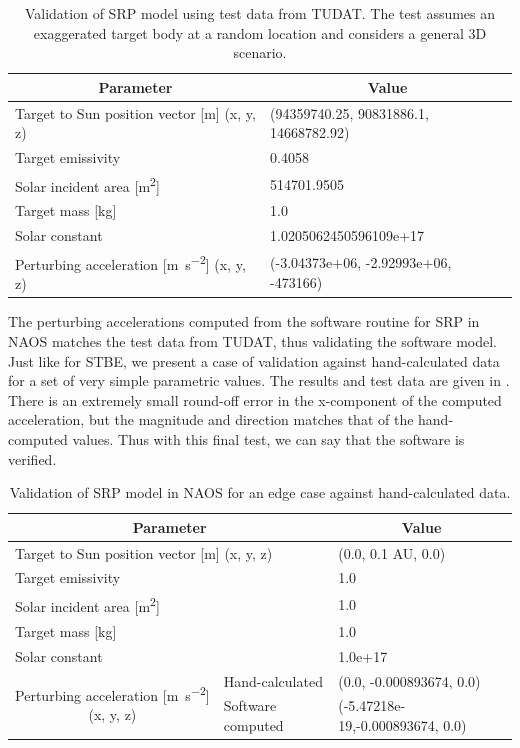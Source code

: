 \begin{table}[htb]
\centering
\captionsetup{justification=centering}
\caption{Validation of \gls{SRP} model using test data from \gls{TUDAT}. The test assumes an exaggerated target body at a random location and considers a general 3D scenario.}
\label{tab:srp_vv_tudat_data_2}
\begin{tabular}{|l|l|}
\hline
\multicolumn{1}{|c|}{\textbf{Parameter}} & \multicolumn{1}{c|}{\textbf{Value}} \\ \hline
Target to Sun position vector {[}m{]} (x, y, z) & (94359740.25, 90831886.1, 14668782.92) \\ \hline
Target emissivity & 0.4058 \\ \hline
Solar incident area {[}\si{\metre \squared}{]} & 514701.9505 \\ \hline
Target mass {[}kg{]} & 1.0 \\ \hline
Solar constant & 1.0205062450596109e+17 \\ \hline
Perturbing acceleration {[}\si{\metre \per \second \squared}{]} (x, y, z) & (-3.04373e+06, -2.92993e+06, -473166) \\ \hline
\end{tabular}
\end{table}
\FloatBarrier
The perturbing accelerations computed from the software routine for \gls{SRP} in \gls{NAOS} matches the test data from \gls{TUDAT}, thus validating the software model. Just like for \gls{STBE}, we present a case of validation against hand-calculated data for a set of very simple parametric values. The results and test data are given in . There is an extremely small round-off error in the x-component of the computed acceleration, but the magnitude and direction matches that of the hand-computed values. Thus with this final test, we can say that the software is verified.
\begin{table}[htb]
\centering
\captionsetup{justification=centering}
\caption{Validation of \gls{SRP} model in \gls{NAOS} for an edge case against hand-calculated data.}
\label{tab:srp_vv_hand_calc_data}
\begin{tabular}{|l|l|l|}
\hline
\multicolumn{2}{|c|}{\textbf{Parameter}} & \multicolumn{1}{c|}{\textbf{Value}} \\ \hline
\multicolumn{2}{|l|}{Target to Sun position vector {[}m{]} (x, y, z)} & (0.0, 0.1 AU, 0.0) \\ \hline
\multicolumn{2}{|l|}{Target emissivity} & 1.0 \\ \hline
\multicolumn{2}{|l|}{Solar incident area {[}\si{\metre \squared}{]}} & 1.0 \\ \hline
\multicolumn{2}{|l|}{Target mass {[}kg{]}} & 1.0 \\ \hline
\multicolumn{2}{|l|}{Solar constant} & 1.0e+17 \\ \hline
\multicolumn{1}{|c|}{\multirow{2}{*}{Perturbing acceleration {[}\si{\metre \per \second \squared}{]} (x, y, z)}} & Hand-calculated & (0.0, -0.000893674, 0.0) \\ \cline{2-3}
\multicolumn{1}{|c|}{} & Software computed & (-5.47218e-19,-0.000893674, 0.0) \\ \hline
\end{tabular}
\end{table}
